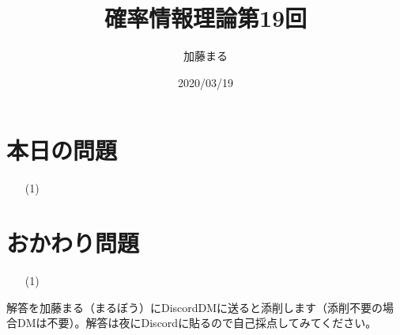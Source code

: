 \documentclass[a4j,uplatex,dvipdfmx]{jsarticle}
\title{確率情報理論第19回}
\author{加藤まる}
\date{2020/03/19}
\begin{document}
\maketitle

\section*{本日の問題}
\begin{itemize}
  \item[(1)]
\end{itemize}


\section*{おかわり問題}
\begin{itemize}
  \item[(1)]
\end{itemize}



解答を加藤まる（まるぼう）にDiscordDMに送ると添削します（添削不要の場合DMは不要）。解答は夜にDiscordに貼るので自己採点してみてください。
\end{document}
